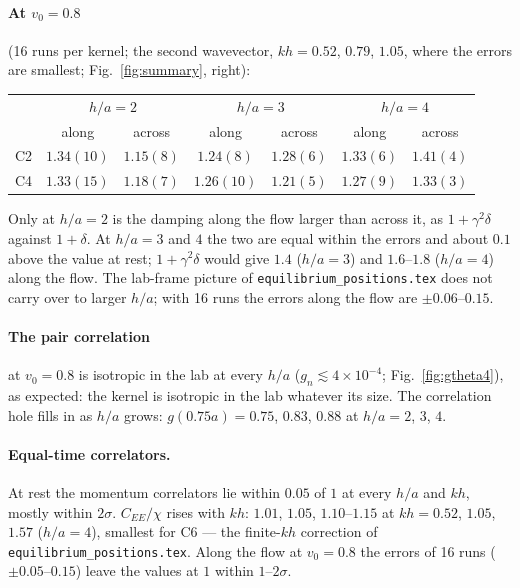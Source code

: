 \documentclass[11pt,aps,preprint,nofootinbib,superscriptaddress,tightenlines]{revtex4-2}
\def\Fig#1{Fig.~\ref{#1}}
\let\oldparagraph\paragraph
\renewcommand{\paragraph}{\par\bigskip\oldparagraph}
\begin{document}
\paragraph{At $v_0=0.8$} (16 runs per kernel; the second wavevector, $kh=0.52$, $0.79$, $1.05$, where the errors are smallest; \Fig{fig:summary}, right):
\begin{center}
\begin{tabular}{lcccccc}
\hline
 & \multicolumn{2}{c}{$h/a=2$} & \multicolumn{2}{c}{$h/a=3$} & \multicolumn{2}{c}{$h/a=4$} \\
 & along & across & along & across & along & across \\ \hline
C2 & $1.34(10)$ & $1.15(8)$ & $1.24(8)$ & $1.28(6)$ & $1.33(6)$ & $1.41(4)$ \\
C4 & $1.33(15)$ & $1.18(7)$ & $1.26(10)$ & $1.21(5)$ & $1.27(9)$ & $1.33(3)$ \\
\hline
\end{tabular}
\end{center}
Only at $h/a=2$ is the damping along the flow larger than across it, as $1+\gamma^2\delta$ against $1+\delta$.  At $h/a=3$ and $4$ the two are equal within
the errors and about $0.1$ above the value at rest; $1+\gamma^2\delta$ would give $1.4$ ($h/a=3$) and $1.6$--$1.8$ ($h/a=4$) along the flow.  The
lab-frame picture of \texttt{equilibrium\_positions.tex} does not carry over to larger $h/a$; with 16 runs the errors along the flow are
$\pm0.06$--$0.15$.

\paragraph{The pair correlation} at $v_0=0.8$ is isotropic in the lab at every $h/a$ ($g_n\lesssim4\times10^{-4}$; \Fig{fig:gtheta4}), as expected: the
kernel is isotropic in the lab whatever its size.  The correlation hole fills in as $h/a$ grows: $g(0.75a)=0.75$, $0.83$, $0.88$ at $h/a=2$, $3$, $4$.

\paragraph{Equal-time correlators.}  At rest the momentum correlators lie within $0.05$ of $1$ at every $h/a$ and $kh$, mostly within $2\sigma$.  $C_{EE}/\chi$ rises with $kh$:
$1.01$, $1.05$, $1.10$--$1.15$ at $kh=0.52$, $1.05$, $1.57$ ($h/a=4$), smallest for C6 --- the finite-$kh$ correction of \texttt{equilibrium\_positions.tex}.
Along the flow at $v_0=0.8$ the errors of 16 runs ($\pm0.05$--$0.15$) leave the values at $1$ within $1$--$2\sigma$.
\end{document}
